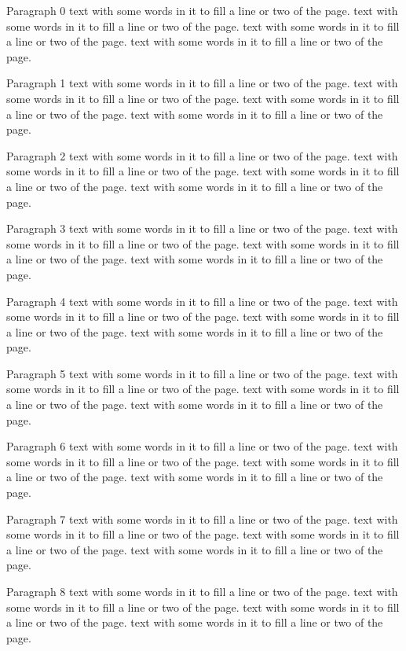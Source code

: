 \documentclass{article}
\begin{document}
Paragraph 0 text with some words in it to fill a line or two of the page. text with some words in it to fill a line or two of the page. text with some words in it to fill a line or two of the page. text with some words in it to fill a line or two of the page. 

Paragraph 1 text with some words in it to fill a line or two of the page. text with some words in it to fill a line or two of the page. text with some words in it to fill a line or two of the page. text with some words in it to fill a line or two of the page. 

Paragraph 2 text with some words in it to fill a line or two of the page. text with some words in it to fill a line or two of the page. text with some words in it to fill a line or two of the page. text with some words in it to fill a line or two of the page. 

Paragraph 3 text with some words in it to fill a line or two of the page. text with some words in it to fill a line or two of the page. text with some words in it to fill a line or two of the page. text with some words in it to fill a line or two of the page. 

Paragraph 4 text with some words in it to fill a line or two of the page. text with some words in it to fill a line or two of the page. text with some words in it to fill a line or two of the page. text with some words in it to fill a line or two of the page. 

Paragraph 5 text with some words in it to fill a line or two of the page. text with some words in it to fill a line or two of the page. text with some words in it to fill a line or two of the page. text with some words in it to fill a line or two of the page. 

Paragraph 6 text with some words in it to fill a line or two of the page. text with some words in it to fill a line or two of the page. text with some words in it to fill a line or two of the page. text with some words in it to fill a line or two of the page. 

Paragraph 7 text with some words in it to fill a line or two of the page. text with some words in it to fill a line or two of the page. text with some words in it to fill a line or two of the page. text with some words in it to fill a line or two of the page. 

Paragraph 8 text with some words in it to fill a line or two of the page. text with some words in it to fill a line or two of the page. text with some words in it to fill a line or two of the page. text with some words in it to fill a line or two of the page. 
\end{document}
